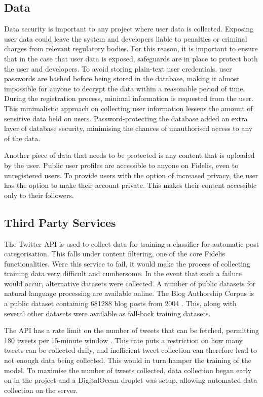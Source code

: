 \subsection{Data}
Data security is important to any project where user data is collected. Exposing user data could leave the system and developers liable to penalties or criminal charges from relevant regulatory bodies. For this reason, it is important to ensure that in the case that user data is exposed, safeguards are in place to protect both the user and developers. To avoid storing plain-text user credentials, user passwords are hashed before being stored in the database, making it almost impossible for anyone to decrypt the data within a reasonable period of time. During the registration process, minimal information is requested from the user. This minimalistic approach on collecting user information lessens the amount of sensitive data held on users. Password-protecting the database added an extra layer of database security, minimising the chances of unauthorised access to any of the data.

Another piece of data that needs to be protected is any content that is uploaded by the user. Public user profiles are accessible to anyone on Fidelis, even to unregistered users. To provide users with the option of increased privacy, the user has the option to make their account private. This makes their content accessible only to their followers.

\subsection{Third Party Services}
The Twitter API is used to collect data for training a classifier for automatic post categorisation. This falls under content filtering, one of the core Fidelis functionalities. Were this service to fail, it would make the process of collecting training data very difficult and cumbersome. In the event that such a failure would occur, alternative datasets were collected. A number of public datasets for natural language processing are available online. The Blog Authorship Corpus is a public dataset containing 681288 blog posts from 2004 \cite{dataset:blogs}. This, along with several other datasets \cite{dataset:all} were available as fall-back training datasets.

The API has a rate limit on the number of tweets that can be fetched, permitting 180 tweets per 15-minute window \cite{twitter-api:rates}. This rate puts a restriction on how many tweets can be collected daily, and inefficient tweet collection can therefore lead to not enough data being collected. This would in turn hamper the training of the model. To maximise the number of tweets collected, data collection began early on in the project and a DigitalOcean droplet was setup, allowing automated data collection on the server.
